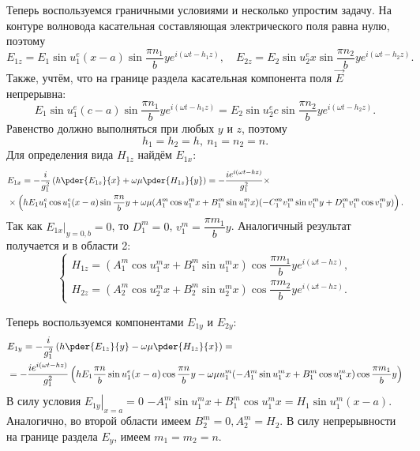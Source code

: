 \documentclass[12pt]{hedsemwork}
\renewcommand{\frac}{\dfrac}
\begin{document}
Теперь воспользуемся граничными условиями и несколько упростим задачу.
На контуре волновода касательная составляющая электрического поля равна нулю,
поэтому
    \[
        E_{1z} = E_1\sin u^e_1 (x-a) \sin \frac{\pi n_1}{b}y
        e^{i(\omega t - h_1 z)},\quad
        E_{2z} = E_2\sin u^e_2 x \sin \frac{\pi n_2}{b}y
        e^{i(\omega t - h_2 z)}.
    \]
Также, учтём, что на границе раздела касательная компонента поля \( \vec{E} \)
непрерывна:
    \[
        E_1\sin u^e_1 (c-a) \sin \frac{\pi n_1}{b}y
        e^{i(\omega t - h_1 z)} =
        E_2\sin u^e_2 c \sin \frac{\pi n_2}{b}y
        e^{i(\omega t - h_2 z)}.
    \]
Равенство должно выполняться при любых \( y \) и \( z \), поэтому
\[
    \boxed{h_1 = h_2 = h,\ n_1 = n_2 = n.}
\]
Для определения вида \( H_{1z} \) найдём \( E_{1x} \):
\begin{align*}
    & E_{1x} =
    -\frac{i}{g_1^2}\left( h\pder{E_{1z}}{x} + \omega\mu\pder{H_{1z}}{y} \right)
    = -\frac{ie^{i(\omega t - h z)}}{g_1^2}\times\\
    &\times\left( h E_1 u^e_1 \cos u^e_1(x-a)\sin\frac{\pi n}{b}y +
    \omega\mu(A^m_1\cos u^m_1 x + B^m_1\sin u^m_1 x)
    (-C^m_1 v^m_1 \sin v^m_1 y + D^m_1 v^m_1 \cos v^m_1 y)\right).
\end{align*}
Так как \( \left.E_{1x}\right|_{y=0,b} = 0 \), то \( D^m_1 = 0 \),
\( v^m_1 = \frac{\pi m_1}{b} y \). Аналогичный результат получается и в области
2:
\[
    \left\{
    \begin{array}{l}
        H_{1z} =
        (A^m_1\cos u^m_1 x + B^m_1\sin u^m_1 x)\cos\frac{\pi m_1}{b}y
        e^{i(\omega t - h z)}, \\
        H_{2z} =
        (A^m_2\cos u^m_2 x + B^m_2\sin u^m_2 x)\cos\frac{\pi m_2}{b}y
        e^{i(\omega t - h z)}.
    \end{array}
    \right.
\]

Теперь воспользуемся компонентами \( E_{1y} \) и \( E_{2y} \):
\begin{align*}
    & E_{1y} = -\frac{i}{g_1^2}\left( h\pder{E_{1z}}{y} -
    \omega\mu\pder{H_{1z}}{x} \right) = \\
    & = -\frac{ie^{i(\omega t - hz)}}{g_1^2}\left( h E_1 \frac{\pi n}{b}
    \sin u^e_1(x-a)\cos\frac{\pi n}{b}y - \omega\mu
    u^m_1 (-A^m_1 \sin u^m_1 x + B^m_1\cos u^m_1 x)\cos\frac{\pi m_1}{b}y
   \right)
\end{align*}
В силу условия \( \left.E_{1y}\right|_{x=a} = 0 \)
\( -A^m_1 \sin u^m_1 x + B^m_1\cos u^m_1 x = H_1\sin u^m_1(x-a) \).
Аналогично, во второй области имеем \(B^m_2=0, A^m_2 = H_2\).
В силу непрерывности на границе раздела \( E_y \), имеем \( m_1 = m_2 = n \).
\end{document}
